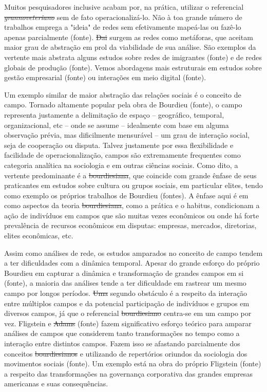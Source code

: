 Muitos pesquisadores inclusive acabam por, na prática, utilizar o referencial \emph{\sout{grannoveteriano}} sem de fato operacionalizá-lo. Não à toa
grande número de trabalhos emprega a "ideia" de redes sem efetivamente
mapeá-las ou fazê-lo apenas parcialmente (fonte). \sout{Dai} surgem as redes
como metáforas, que aceitam maior grau de abstração em prol da viabilidade de sua análise. São exemplos da vertente mais abstrata alguns estudos sobre redes de imigrantes (fonte) e de redes globais de produção (fonte). Vemos abordagens mais estruturais em estudos sobre gestão empresarial (fonte) ou interações em meio digital (fonte).

Um exemplo similar de maior abstração das relações sociais é o conceito de campo. Tornado altamente popular pela obra de Bourdieu (fonte), o campo representa justamente a delimitação de espaço -- geográfico, temporal, organizacional, etc -- onde se assume -- idealmente com base em alguma observação prévia, mas dificilmente mensurável -- um grau
de interação social, seja de cooperação ou disputa. Talvez justamente por essa flexibilidade e facilidade de operacionalização, campos são extremamente
frequentes como categoria analítica na sociologia e em outras ciências sociais. Como dito, a
vertente predominante é a \sout{bourdiesiana}, que coincide com grande ênfase
de seus praticantes em estudos sobre cultura ou grupos sociais, em
particular elites, tendo como exemplo os próprios trabalhos de Bourdieu (fontes). A ênfase aqui é em como aspectos da teoria \sout{bourdiesiana}, como a prática e o habitus, condicionam a ação de indivíduos em campos que são muitas vezes econômicos ou onde há forte prevalência de recursos econômicos em disputas: empresas, mercados, diretorias, elites econômicas, etc.

Assim como análises de rede, os estudos amparados no conceito de campo
tendem a ter dificuldades com a dinâmica temporal. Apesar do grande
esforço do próprio Bourdieu em capturar a dinâmica e transformação
de grandes campos em si (fonte), a maioria das análises tende
a ter dificuldade em rastrear um mesmo campo por longos períodos. \sout{Uma} segundo obstáculo é a respeito da interação entre múltiplos campos e da potencial participação de indivíduos e grupos em diversos campos, já que o referencial \sout{bourdiesiano} centra-se em um campo por vez. Fligstein e \sout{Adams} (fonte) fazem significativo esforço teórico para amparar análises de campos que considerem tanto transformações no tempo como a interação entre distintos campos. Fazem isso se 
afastando parcialmente dos conceitos \sout{bourdiesianos} e 
utilizando de repertórios oriundos da sociologia dos movimentos sociais (fonte). Um exemplo está na obra do próprio Fligstein (fonte) a respeito das transformações na governança corporativa das grandes empresas americanas e suas consequências.

